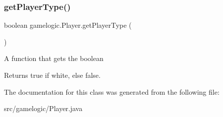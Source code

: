 \subsubsection{\texorpdfstring{get\+Player\+Type()}{getPlayerType()}}
{\footnotesize\ttfamily boolean gamelogic.\+Player.\+get\+Player\+Type (\begin{DoxyParamCaption}{ }\end{DoxyParamCaption})}

A function that gets the boolean \begin{DoxyReturn}{Returns}
true if white, else false. 
\end{DoxyReturn}


The documentation for this class was generated from the following file\+:\begin{DoxyCompactItemize}
\item 
src/gamelogic/Player.\+java\end{DoxyCompactItemize}
